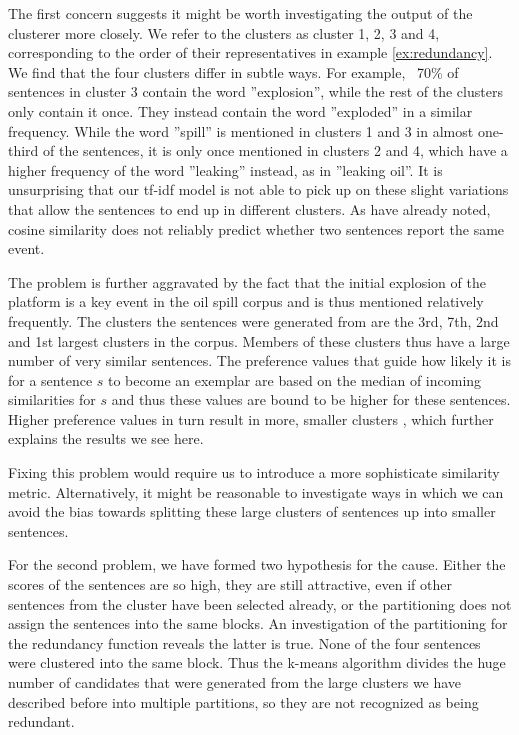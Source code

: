 \documentclass[a4paper,BCOR=10mm]{report}
\numberwithin{lemma}{chapter}
\numberwithin{definition}{chapter}
\begin{document}
The first concern suggests it might be worth investigating the output of the clusterer more closely.
We refer to the clusters as cluster 1, 2, 3 and 4, corresponding to the order of their representatives in example \ref{ex:redundancy}.
We find that the four clusters differ in subtle ways.
For example, ~70\% of sentences in cluster 3 contain the word ''explosion'', while the rest of the clusters only contain it once. They instead contain the word ''exploded'' in a similar frequency.
While the word ''spill'' is mentioned in clusters 1 and 3 in almost one-third of the sentences, it is only once mentioned in clusters 2 and 4, which have a higher frequency of the word ''leaking'' instead, as in ''leaking oil''.
It is unsurprising that our tf-idf model is not able to pick up on these slight variations that allow the sentences to end up in different clusters. As \citet{chieu} have already noted, cosine similarity does not reliably predict whether two sentences report the same event.

The problem is further aggravated by the fact that the initial explosion of the platform is a key event in the oil spill corpus and is thus mentioned relatively frequently. The clusters the sentences were generated from are the 3rd, 7th, 2nd and 1st largest clusters in the corpus. Members of these clusters thus have a large number of very similar sentences. The preference values that guide how likely it is for a sentence $s$ to become an exemplar are based on the median of incoming similarities for $s$ and thus these values are bound to be higher for these sentences.
Higher preference values in turn result in more, smaller clusters \citep{ap}, which further explains the results we see here.

Fixing this problem would require us to introduce a more sophisticate similarity metric. Alternatively, it might be reasonable to investigate ways in which we can avoid the bias towards splitting these large clusters of sentences up into smaller sentences.

For the second problem, we have formed two hypothesis for the cause. Either the scores of the sentences are so high, they are still attractive, even if other sentences from the cluster have been selected already, or the partitioning does not assign the sentences into the same blocks.
An investigation of the partitioning for the redundancy function reveals the latter is true. None of the four sentences were clustered into the same block. Thus the k-means algorithm divides the huge number of candidates that were generated from the large clusters we have described before into multiple partitions, so they are not recognized as being redundant.
\end{document}
